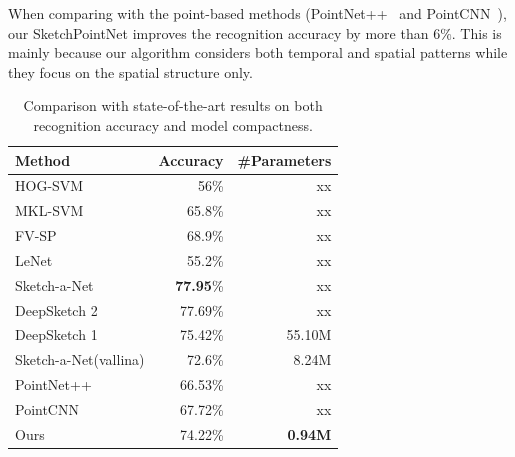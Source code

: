 When comparing with the point-based methods (PointNet++~\cite{qi2017pointnetplusplus} and PointCNN~\cite{1801.07791}), our SketchPointNet improves the recognition accuracy by more than $6\%$.
This is mainly because our algorithm considers both temporal and spatial patterns while they focus on the spatial structure only.



\begin{table}[htbp]
\centering
\caption{Comparison with state-of-the-art results on both recognition accuracy and model compactness.}
\label{tb:acc-size}
\begin{tabular}{l|rr}
    \hline
     Method & Accuracy & \#Parameters\\
    \hline
     HOG-SVM \cite{Eitz2012HowDH}& 56\% & xx \\
     MKL-SVM \cite{LiHSG15} & 65.8\%  & xx \\
     FV-SP \cite{Schneider2014SketchCA} & 68.9\%  & xx\\
     LeNet \cite{LeCun1998GradientbasedLA}& 55.2\%  & xx\\
     \hline
     Sketch-a-Net \cite{Yu2015SketchaNetTB}& \textbf{77.95}\%  & xx\\
     DeepSketch 2 \cite{Dupont2016DeepSketch2D}& 77.69\%  & xx\\
     \hline
     DeepSketch 1 \cite{Seddati2015DeepSketchDC}& 75.42\%  & 55.10M\\
     Sketch-a-Net(vallina) \cite{Yu2015SketchaNetTB}& 72.6\% & 8.24M \\
     \hline
     PointNet++ \cite{qi2017pointnetplusplus}& 66.53\%  & xx\\
     PointCNN \cite{1801.07791}& 67.72\%  & xx\\
     Ours& 74.22\%  & \textbf{0.94M}\\
    \hline
\end{tabular}
\end{table}



